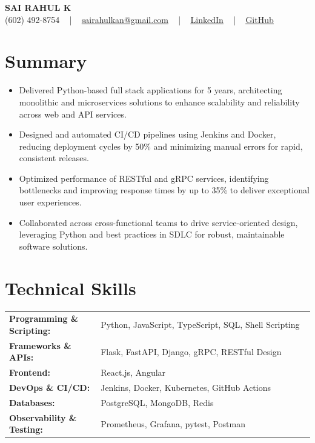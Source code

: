 \documentclass[letterpaper,11pt]{article}
\newcommand{\resumeItem}[1]{
  \item\footnotesize{
    {#1 \vspace{-2pt}}
  }
}
\newcommand{\resumeItemListStart}{\begin{itemize}[leftmargin=*]}
\newcommand{\resumeItemListEnd}{\end{itemize}\vspace{-5pt}}
\begin{document}
\begin{center}
    {\fontsize{14pt}{12pt}\selectfont \textbf{\MakeUppercase{Sai Rahul K}}}\\ \vspace{2pt}
    \fontsize{10pt}{12pt}\selectfont (602) 492-8754 ~ | ~ \href{mailto:sairahulkan@gmail.com}{sairahulkan@gmail.com} ~ | ~
    \href{https://www.linkedin.com/in/rq123/}{\color{blue}\underline{LinkedIn}} ~ | ~
    \href{https://github.com/kanrahuldo}{\color{blue}\underline{GitHub}}~
    \vspace{-8pt}
\end{center}

\section{Summary}
\fontsize{9pt}{10pt}\selectfont
\resumeItemListStart
    \resumeItem{Delivered Python-based full stack applications for 5 years, architecting monolithic and microservices solutions to enhance scalability and reliability across web and API services.}
    \resumeItem{Designed and automated CI/CD pipelines using Jenkins and Docker, reducing deployment cycles by 50\% and minimizing manual errors for rapid, consistent releases.}
    \resumeItem{Optimized performance of RESTful and gRPC services, identifying bottlenecks and improving response times by up to 35\% to deliver exceptional user experiences.}
    \resumeItem{Collaborated across cross-functional teams to drive service-oriented design, leveraging Python and best practices in SDLC for robust, maintainable software solutions.}
\resumeItemListEnd
\vspace{-6pt}

\section{Technical Skills}
        \vspace{-14pt}
        \begin{table}[h]
            \fontsize{9pt}{10pt}\selectfont
            \begin{tabular}{p{0.3\linewidth} p{0.7\linewidth}}
                \textbf{Programming \& Scripting:} & Python, JavaScript, TypeScript, SQL, Shell Scripting \\
                \textbf{Frameworks \& APIs:} & Flask, FastAPI, Django, gRPC, RESTful Design \\
                \textbf{Frontend:} & React.js, Angular \\
                \textbf{DevOps \& CI/CD:} & Jenkins, Docker, Kubernetes, GitHub Actions \\
                \textbf{Databases:} & PostgreSQL, MongoDB, Redis \\
                \textbf{Observability \& Testing:} & Prometheus, Grafana, pytest, Postman \\
            \end{tabular}
        \end{table}
    \vspace{-15pt}
\end{document}
